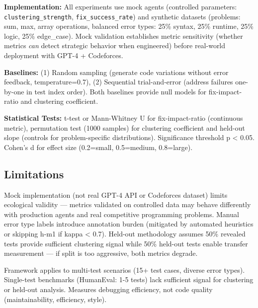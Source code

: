 \textbf{Implementation:} All experiments use mock agents (controlled parameters: \texttt{clustering\_strength}, \texttt{fix\_success\_rate}) and synthetic datasets (problems: sum, max, array operations, balanced error types: 25\% syntax, 25\% runtime, 25\% logic, 25\% edge\_case). Mock validation establishes metric sensitivity (whether metrics \emph{can} detect strategic behavior when engineered) before real-world deployment with GPT-4 + Codeforces.

\textbf{Baselines:} (1) Random sampling (generate code variations without error feedback, temperature=0.7), (2) Sequential trial-and-error (address failures one-by-one in test index order). Both baselines provide null models for fix-impact-ratio and clustering coefficient.

\textbf{Statistical Tests:} t-test or Mann-Whitney U for fix-impact-ratio (continuous metric), permutation test (1000 samples) for clustering coefficient and held-out slope (controls for problem-specific distributions). Significance threshold p < 0.05. Cohen's d for effect size (0.2=small, 0.5=medium, 0.8=large).

\subsection{Limitations}

Mock implementation (not real GPT-4 API or Codeforces dataset) limits ecological validity — metrics validated on controlled data may behave differently with production agents and real competitive programming problems. Manual error type labels introduce annotation burden (mitigated by automated heuristics or skipping h-m1 if kappa < 0.7). Held-out methodology assumes 50\% revealed tests provide sufficient clustering signal while 50\% held-out tests enable transfer measurement — if split is too aggressive, both metrics degrade.

Framework applies to multi-test scenarios (15+ test cases, diverse error types). Single-test benchmarks (HumanEval: 1-5 tests) lack sufficient signal for clustering or held-out analysis. Measures debugging efficiency, not code quality (maintainability, efficiency, style).
